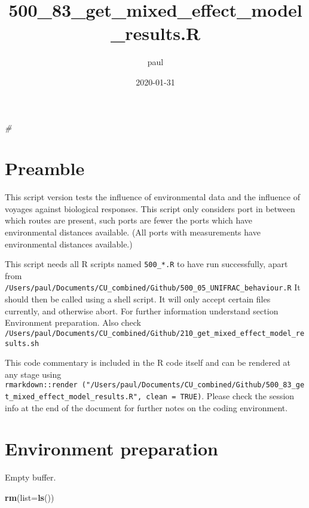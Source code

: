 \documentclass[
]{article}
\title{500\_83\_get\_mixed\_effect\_model\_results.R}
\author{paul}
\date{2020-01-31}
\newenvironment{Shaded}{\begin{snugshade}}{\end{snugshade}}
\newcommand{\CommentTok}[1]{\textcolor[rgb]{0.56,0.35,0.01}{\textit{#1}}}
\newcommand{\DataTypeTok}[1]{\textcolor[rgb]{0.13,0.29,0.53}{#1}}
\newcommand{\KeywordTok}[1]{\textcolor[rgb]{0.13,0.29,0.53}{\textbf{#1}}}
\newcommand{\NormalTok}[1]{#1}
\begin{document}
\maketitle

{
\setcounter{tocdepth}{3}
\tableofcontents
}
\begin{Shaded}
\begin{Highlighting}[]
\CommentTok{\# }
\end{Highlighting}
\end{Shaded}

\hypertarget{preamble}{%
\section{Preamble}\label{preamble}}

This script version tests the influence of environmental data and the
influence of voyages against biological responses. This script only
considers port in between which routes are present, such ports are fewer
the ports which have environmental distances available. (All ports with
measurements have environmental distances available.)

This script needs all R scripts named \texttt{500\_*.R} to have run
successfully, apart from
\texttt{/Users/paul/Documents/CU\_combined/Github/500\_05\_UNIFRAC\_behaviour.R}
It should then be called using a shell script. It will only accept
certain files currently, and otherwise abort. For further information
understand section Environment preparation. Also check
\texttt{/Users/paul/Documents/CU\_combined/Github/210\_get\_mixed\_effect\_model\_results.sh}

This code commentary is included in the R code itself and can be
rendered at any stage using
\texttt{rmarkdown::render\ ("/Users/paul/Documents/CU\_combined/Github/500\_83\_get\_mixed\_effect\_model\_results.R",\ clean\ =\ TRUE)}.
Please check the session info at the end of the document for further
notes on the coding environment.

\hypertarget{environment-preparation}{%
\section{Environment preparation}\label{environment-preparation}}

Empty buffer.

\begin{Shaded}
\begin{Highlighting}[]
\KeywordTok{rm}\NormalTok{(}\DataTypeTok{list=}\KeywordTok{ls}\NormalTok{())}
\end{Highlighting}
\end{Shaded}
\end{document}
